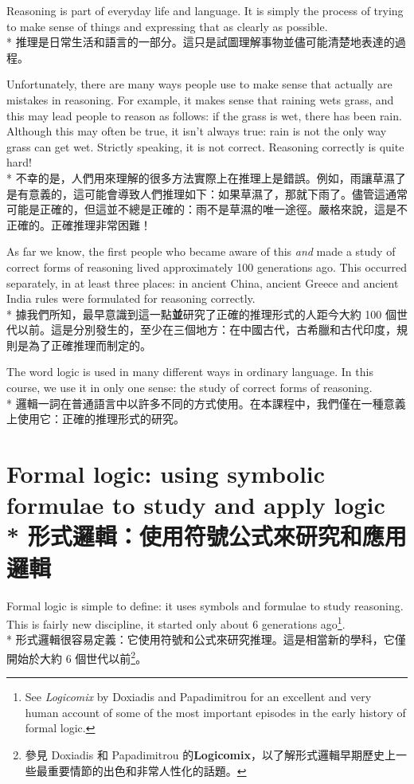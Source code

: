 \documentclass[]{article}
\begin{document}
{\color{gray}Reasoning is part of everyday life and language. It is simply the process of trying to make sense of things and expressing that as clearly as possible.}
\\*
{推理是日常生活和語言的一部分。這只是試圖理解事物並儘可能清楚地表達的過程。}

{\color{gray}Unfortunately, there are many ways people use to make sense that actually are mistakes in reasoning. For example, it makes sense that raining wets grass, and this may lead people to reason as follows: if the grass is wet, there has been rain. Although this may often be true, it isn't always true: rain is not the only way grass can get wet. Strictly speaking, it is not correct. Reasoning correctly is quite hard!}
\\*
{不幸的是，人們用來理解的很多方法實際上在推理上是錯誤。例如，雨讓草濕了是有意義的，這可能會導致人們推理如下：如果草濕了，那就下雨了。儘管這通常可能是正確的，但這並不總是正確的：雨不是草濕的唯一途徑。嚴格來說，這是不正確的。正確推理非常困難！}

{\color{gray}As far we know, the first people who became aware of this \emph{and} made a study of correct forms of reasoning lived approximately 100 generations ago. This occurred separately, in at least three places: in ancient China, ancient Greece and ancient India rules were formulated for reasoning correctly.}
\\*
{據我們所知，最早意識到這一點{\bfseries{並}}研究了正確的推理形式的人距今大約 100 個世代以前。這是分別發生的，至少在三個地方：在中國古代，古希臘和古代印度，規則是為了正確推理而制定的。}

{\color{gray}The word logic is used in many different ways in ordinary language. In this course, we use it in only one sense: the study of correct forms of reasoning.}
\\*
{邏輯一詞在普通語言中以許多不同的方式使用。在本課程中，我們僅在一種意義上使用它：正確的推理形式的研究。}

\section*{{\color{gray}Formal logic: using symbolic formulae to study and apply logic}
\\*
{形式邏輯：使用符號公式來研究和應用邏輯}}

{\color{gray}Formal logic is simple to define: it uses symbols and formulae to study reasoning. This is fairly new discipline, it started only about 6 generations ago\footnote{See \emph{Logicomix} by Doxiadis and Papadimitrou for an excellent and very human account of some of the most important episodes in the early history of formal logic.}.}
\\*
{形式邏輯很容易定義：它使用符號和公式來研究推理。這是相當新的學科，它僅開始於大約 6 個世代以前\footnote{參見{ }Doxiadis{ }和{ }Papadimitrou{ }的{\bfseries{Logicomix}}，以了解形式邏輯早期歷史上一些最重要情節的出色和非常人性化的話題。}。}
\end{document}
